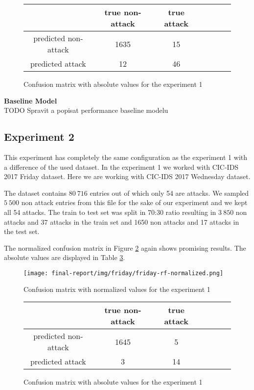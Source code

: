\documentclass{article}
\begin{document}
\begin{figure}[h!]
\centering
\begin{tabular}{ |c|c|c|c|c|c|c| }
 \hline
  & true non-attack & true attack \\
 \hline
 predicted non-attack & 1635 & 15 \\
 \hline
 predicted attack & 12 & 46 \\
 \hline
\end{tabular}
\caption{Confusion matrix with absolute values for the experiment 1}
\label{tab-friday-rf-absolute}
\end{figure}

\textbf{Baseline Model}\\
TODO Spravit a popisat performance baseline modelu\\





\subsection{Experiment 2}
This experiment has completely the same configuration as the experiment 1 with a difference of the used dataset. In the experiment 1 we worked with CIC-IDS 2017 Friday dataset. Here we are working with CIC-IDS 2017 Wednesday dataset.

The dataset contains $80\ 716$ entries out of which only 54 are attacks. We sampled $5\ 500$ non attack entries from this file for the sake of our experiment and we kept all 54 attacks. The train to test set was split in 70:30 ratio resulting in $3\ 850$ non attacks and 37 attacks in the train set and 1650 non attacks and 17 attacks in the test set.

The normalized confusion matrix in Figure \ref{fig-thursday-rf-normalized} again shows promising results. The absolute values are displayed in Table \ref{tab-thursday-rf-absolute}.

\begin{figure}[h!]
    \centering
    \texttt{[image: final-report/img/friday/friday-rf-normalized.png]}
    \caption{Confusion matrix with normalized values for the experiment 1}
    \label{fig-thursday-rf-normalized}
\end{figure}

\begin{figure}[h!]
\centering
\begin{tabular}{ |c|c|c|c|c|c|c| }
 \hline
  & true non-attack & true attack \\
 \hline
 predicted non-attack & 1645 & 5 \\
 \hline
 predicted attack & 3 & 14 \\
 \hline
\end{tabular}
\caption{Confusion matrix with absolute values for the experiment 1}
\label{tab-thursday-rf-absolute}
\end{figure}
\end{document}
